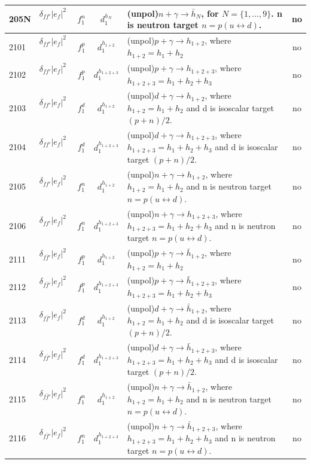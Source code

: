 \documentclass[prd,nofootinbib,eqsecnum,final]{revtex4}
\renewcommand{\(}{\left(}
\renewcommand{\)}{\right)}
\renewcommand{\[}{\left[}
\renewcommand{\]}{\right]}
\begin{document}
\begin{center}
\begin{longtable}{||l|p{6cm}|c|c||p{7cm}|c||}
205N & $\delta_{ff'}|e_f|^2$~~&$f^{n}_1$ & $d^{h_N}_1$ & (unpol)$n+\gamma\to \bar h_N$, for $N=\{1,...,9\}$. n is neutron target $n=p(u\leftrightarrow d)$. & no
\\\hline \hline
2101 & $\delta_{ff'}|e_f|^2$~~&$f^p_1$ & $d^{h_{1+2}}_1$ & (unpol)$p+\gamma\to h_{1+2}$, where $h_{1+2}=h_1+h_2$ & no
\\\hline
2102 & $\delta_{ff'}|e_f|^2$~~&$f^p_1$ & $d^{h_{1+2+3}}_1$ & (unpol)$p+\gamma\to h_{1+2+3}$, where $h_{1+2+3}=h_1+h_2+h_3$ & no
\\\hline
2103 & $\delta_{ff'}|e_f|^2$~~&$f^d_1$ & $d^{h_{1+2}}_1$ & (unpol)$d+\gamma\to h_{1+2}$, where $h_{1+2}=h_1+h_2$ and d is isoscalar target $(p+n)/2$. & no
\\\hline
2104 & $\delta_{ff'}|e_f|^2$~~&$f^d_1$ & $d^{h_{1+2+3}}_1$ & (unpol)$d+\gamma\to h_{1+2+3}$, where $h_{1+2+3}=h_1+h_2+h_3$ and d is isoscalar target $(p+n)/2$. & no
\\\hline
2105 & $\delta_{ff'}|e_f|^2$~~&$f^n_1$ & $d^{h_{1+2}}_1$ & (unpol)$n+\gamma\to h_{1+2}$, where $h_{1+2}=h_1+h_2$ and n is neutron target $n=p(u\leftrightarrow d)$. & no
\\\hline
2106 & $\delta_{ff'}|e_f|^2$~~&$f^n_1$ & $d^{h_{1+2+3}}_1$ & (unpol)$n+\gamma\to h_{1+2+3}$, where $h_{1+2+3}=h_1+h_2+h_3$ and n is neutron target $n=p(u\leftrightarrow d)$. & no
\\\hline
2111 & $\delta_{f\bar f'}|e_f|^2$~~&$f^p_1$ & $d^{h_{1+2}}_1$ & (unpol)$p+\gamma\to \bar h_{1+2}$, where $h_{1+2}=h_1+h_2$ & no
\\\hline
2112 & $\delta_{f\bar f'}|e_f|^2$~~&$f^p_1$ & $d^{h_{1+2+3}}_1$ & (unpol)$p+\gamma\to \bar h_{1+2+3}$, where $h_{1+2+3}=h_1+h_2+h_3$ & no
\\\hline
2113 & $\delta_{f\bar f'}|e_f|^2$~~&$f^d_1$ & $d^{h_{1+2}}_1$ & (unpol)$d+\gamma\to \bar h_{1+2}$, where $h_{1+2}=h_1+h_2$ and d is isoscalar target $(p+n)/2$. & no
\\\hline
2114 & $\delta_{f\bar f'}|e_f|^2$~~&$f^d_1$ & $d^{h_{1+2+3}}_1$ & (unpol)$d+\gamma\to \bar h_{1+2+3}$, where $h_{1+2+3}=h_1+h_2+h_3$ and d is isoscalar target $(p+n)/2$. & no
\\\hline
2115 & $\delta_{f\bar f'}|e_f|^2$~~&$f^n_1$ & $d^{h_{1+2}}_1$ & (unpol)$n+\gamma\to \bar h_{1+2}$, where $h_{1+2}=h_1+h_2$ and n is neutron target $n=p(u\leftrightarrow d)$. & no
\\\hline
2116 & $\delta_{f\bar f'}|e_f|^2$~~&$f^n_1$ & $d^{h_{1+2+3}}_1$ & (unpol)$n+\gamma\to \bar h_{1+2+3}$, where $h_{1+2+3}=h_1+h_2+h_3$ and n is neutron target $n=p(u\leftrightarrow d)$. & no
\\\hline\hline
\end{longtable}


\end{center}
\end{document}
